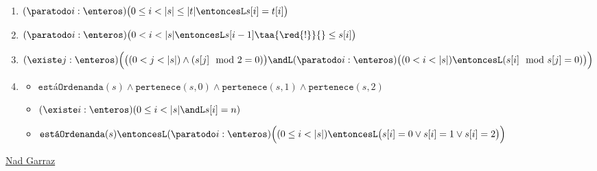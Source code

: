 \begin{enumerate}[label=\alph*)]
  \item
        {$
            (\paratodo i : \enteros)
            \bigl(
            0 \leq i < |s| \leq |t|
            \entoncesL
            s[i] = t[i]
            \bigr)
          $}

  \item
        {$
            (\paratodo i : \enteros)
            \bigl(
            0 < i < |s|
            \entoncesL
            s[i-1] \taa{\red{!}}{}\leq s[i]
            \bigr)
          $}

  \item
        {\hspace{-1em}$
            (\existe j : \enteros)
            \Bigl(
            \bigl(
            (0 < j < |s|)
            \land
            (s[j] \mod 2 = 0)
            \bigr)
            \andL
            (\paratodo i : \enteros)
            \bigl(
            (0 < i < |s|)
            \entoncesL
            (s[i] \mod s[j] = 0)
            \bigr)
            \Bigr)
          $}

  \item
        \begin{itemize}
          \item
                {$
                    \texttt{estáOrdenanda}(s) \land
                    \texttt{pertenece}(s,0) \land
                    \texttt{pertenece}(s,1) \land
                    \texttt{pertenece}(s,2)
                  $}
          \item[\hypertarget{aux:pertenece}{\tiny\faIcon{gamepad}}]
                {
                  $
                    (\existe i: \enteros)(0 \leq i < |s| \andL s[i] = n)
                  $
                }

          \item
                {$
                    \texttt{estáOrdenanda}(s)
                    \entoncesL
                    (\paratodo i: \enteros)
                    \Bigl(
                    (0 \leq i < |s|)
                    \entoncesL
                    \bigl(
                    s[i] = 0
                    \lor
                    s[i] = 1
                    \lor
                    s[i] = 2
                    \bigr)
                    \Bigr)
                  $}
        \end{itemize}
\end{enumerate}

\begin{aportes}
  \item \href{\dirRepo}{Nad Garraz \github}
\end{aportes}
